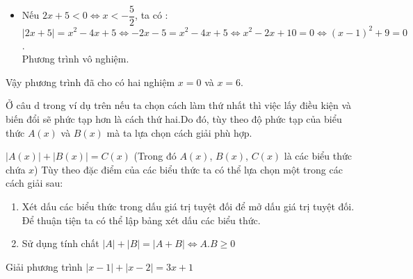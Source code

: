 \begin{vd}
{\begin{enumerate}
\begin{itemize}
				$\left| 2x+5\right|=x^2-4x+5\Leftrightarrow 2x+5=x^2-4x+5\Leftrightarrow x^2-6x=0\Leftrightarrow x(x-6)=0\Leftrightarrow \hoac{&x=0\ (\mbox{nhận})\\&x=6\ (\mbox{nhận})}$.
				\item Nếu $2x+5< 0\Leftrightarrow x< -\dfrac{5}{2}$, ta có :\\
				$\left| 2x+5\right|=x^2-4x+5\Leftrightarrow -2x-5=x^2-4x+5\Leftrightarrow x^2-2x+10=0\Leftrightarrow (x-1)^2+9=0$. \\
				Phương trình vô nghiệm.
			\end{itemize}
			Vậy phương trình đã cho có hai nghiệm $x=0$ và $x=6$.
		\end{enumerate}
	}
\end{vd}
\begin{note}
	Ở câu d trong ví dụ trên nếu ta chọn cách làm thứ nhất thì việc lấy điều kiện và biến đổi sẽ phức tạp hơn là cách thứ hai.Do đó, tùy theo độ phức tạp của biểu thức $A(x)$ và $B(x)$ mà ta lựa chọn cách giải phù hợp.
\end{note}
\begin{dang}{$|A(x)|+|B(x)|=C(x)$ (Trong đó $A(x)$, $B(x)$, $C(x)$ là các biểu thức chứa $x$)}
	Tùy theo đặc điểm của các biểu thức ta có thể lựa chọn một trong các cách giải sau: 
	\begin{enumerate}[Cách 1.]
		\item  Xét dấu các biểu thức trong dấu giá trị tuyệt đối để mở dấu giá trị tuyệt đối. Để thuận tiện ta có thể lập bảng xét dấu các biểu thức.
		\item Sử dụng tính chất $|A|+|B|=|A+B|\Leftrightarrow A.B\geq 0$
	\end{enumerate}
\end{dang}
\begin{vd}%
	Giải phương trình $\left| x-1\right|+\left| x-2\right|=3x+1$
\end{vd}
